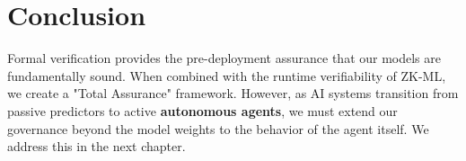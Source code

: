 \section{Conclusion}
\label{sec:conclusion_verification_ch20}

Formal verification provides the pre-deployment assurance that our models are fundamentally sound. When combined with the runtime verifiability of ZK-ML, we create a "Total Assurance" framework. However, as AI systems transition from passive predictors to active \textbf{autonomous agents}, we must extend our governance beyond the model weights to the behavior of the agent itself. We address this in the next chapter.


